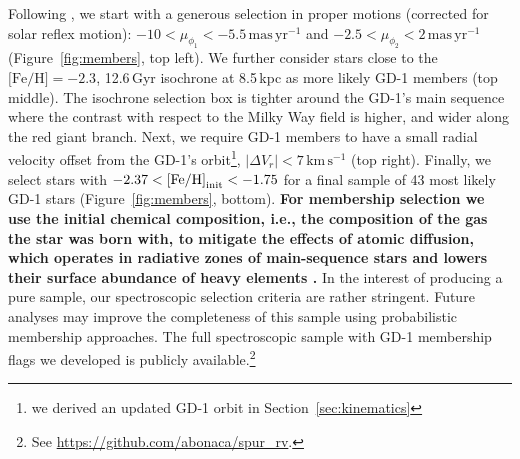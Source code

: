 \documentclass[twocolumn]{aastex63}
\newcommand{\kms}{\ensuremath{\textrm{km}\,\textrm{s}^{-1}}}
\newcommand{\masyr}{\ensuremath{\textrm{mas}\,\textrm{yr}^{-1}}}
\newcommand{\feh}{\ensuremath{\textrm{[Fe/H]}}}
\newcommand{\changes}[1]{{\textbf{#1}}}
\begin{document}
Following \citet{pwb}, we start with a generous selection in proper motions (corrected for solar reflex motion): $-10<\mu_{\phi_1}<-5.5\,\masyr$ and $-2.5<\mu_{\phi_2}<2\,\masyr$ (Figure~\ref{fig:members}, top left).
We further consider stars close to the $\textrm{[Fe/H]}=-2.3$, 12.6\,Gyr isochrone at 8.5\,kpc \citep{choi2016} as more likely GD-1 members (top middle).
The isochrone selection box is tighter around the GD-1's main sequence where the contrast with respect to the Milky Way field is higher, and wider along the red giant branch.
Next, we require GD-1 members to have a small radial velocity offset from the GD-1's orbit\footnote{we derived an updated GD-1 orbit in Section~\ref{sec:kinematics}}, $|\Delta V_r| < 7\,\kms$ (top right).
Finally, we select stars with $-2.37<\feh_{\rm init}<-1.75$ for a final sample of 43 most likely GD-1 stars (Figure~\ref{fig:members}, bottom).
\changes{For membership selection we use the initial chemical composition, i.e., the composition of the gas the star was born with, to mitigate the effects of atomic diffusion, which operates in radiative zones of main-sequence stars and lowers their surface abundance of heavy elements \citep{dotter2017}.}
In the interest of producing a pure sample, our spectroscopic selection criteria are rather stringent.
Future analyses may improve the completeness of this sample using probabilistic membership approaches.
The full spectroscopic sample with GD-1 membership flags we developed is publicly available.\footnote{See \url{https://github.com/abonaca/spur_rv}.}
\end{document}
